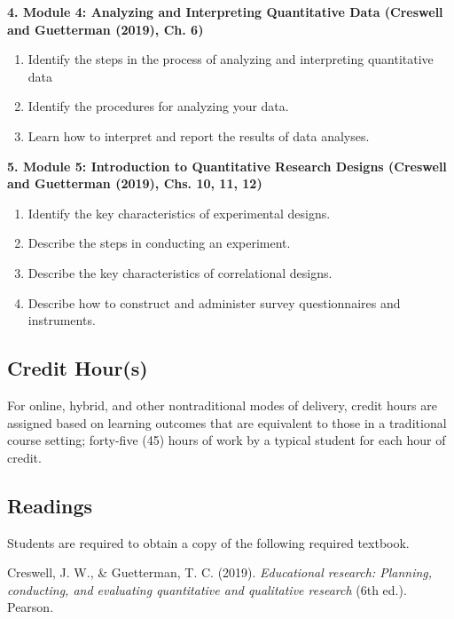 \documentclass[
]{article}
\providecommand{\tightlist}{%
  \setlength{\itemsep}{0pt}\setlength{\parskip}{0pt}}
\begin{document}
\textbf{4. Module 4: Analyzing and Interpreting Quantitative Data
(Creswell and Guetterman (2019), Ch. 6)}

\begin{enumerate}
\def\labelenumi{\arabic{enumi}.}
\tightlist
\item
  Identify the steps in the process of analyzing and interpreting
  quantitative data
\item
  Identify the procedures for analyzing your data.
\item
  Learn how to interpret and report the results of data analyses.
\end{enumerate}

\textbf{5. Module 5: Introduction to Quantitative Research Designs
(Creswell and Guetterman (2019), Chs. 10, 11, 12)}

\begin{enumerate}
\def\labelenumi{\arabic{enumi}.}
\tightlist
\item
  Identify the key characteristics of experimental designs.
\item
  Describe the steps in conducting an experiment.
\item
  Describe the key characteristics of correlational designs.
\item
  Describe how to construct and administer survey questionnaires and
  instruments.
\end{enumerate}

\subsection{Credit Hour(s)}

For online, hybrid, and other nontraditional modes of delivery, credit
hours are assigned based on learning outcomes that are equivalent to
those in a traditional course setting; forty-five (45) hours of work by
a typical student for each hour of credit.

\subsection{Readings}

Students are required to obtain a copy of the following required
textbook.

\begin{hangparas}{.4in}{1}
Creswell, J. W., \& Guetterman, T. C. (2019). {\em{Educational research: Planning, conducting, and evaluating quantitative and qualitative research}} (6th ed.). Pearson.
\end{hangparas}
\end{document}
